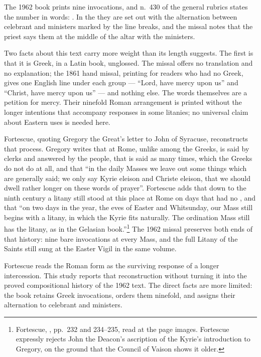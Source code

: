 The 1962 book prints nine invocations, and n.~430 of the general rubrics states
the number in words: . In the  they are set out with the
alternation between celebrant and ministers marked by the line breaks, and the
missal notes that the priest says them at the middle of the altar with the
ministers.

Two facts about this text carry more weight than its length suggests. The
first is that it is Greek, in a Latin book, unglossed. The missal offers no
translation and no explanation; the 1861 hand missal, printing for readers who
had no Greek, gives one English line under each group --- ``Lord, have mercy
upon us'' and ``Christ, have mercy upon us'' --- and nothing else. The words
themselves are a petition for mercy. Their ninefold Roman arrangement is
printed without the longer intentions that accompany responses in some
litanies; no universal claim about Eastern uses is needed here.

Fortescue, quoting Gregory the Great's letter to John of Syracuse, reconstructs
that process. Gregory writes that at Rome, unlike among the Greeks,
 is said by clerks and answered by the people, that
 is said as many times, which the Greeks do not do at
all, and that ``in the daily Masses we leave out some things which are
generally said; we only say Kyrie eleison and Christe eleison, that we should
dwell rather longer on these words of prayer''. Fortescue adds that down to the
ninth century a litany still stood at this place at Rome on days that had no
, and that ``on two days in the year, the eves of Easter and
Whitsunday, our Mass still begins with a litany, in which the Kyrie fits
naturally. The ordination Mass still has the litany, as in the Gelasian
book.''\footnote{Fortescue, , pp.~232 and 234--235, read at the
page images. Fortescue expressly rejects John the Deacon's ascription of the
Kyrie's introduction to Gregory, on the ground that the Council of Vaison shows
it older.} The 1962 missal preserves both ends of that history: nine bare
invocations at every Mass, and the full Litany of the Saints still sung at the
Easter Vigil in the same volume.

Fortescue reads the Roman form as the surviving response of a longer
intercession. This study reports that reconstruction without turning it into
the proved compositional history of the 1962 text. The direct facts are more
limited: the book retains Greek invocations, orders them ninefold, and assigns
their alternation to celebrant and ministers.

